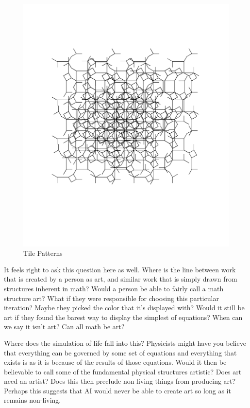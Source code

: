 \documentclass[12pt,twoside]{reedthesis}
\begin{document}
	\begin{figure}[h]
	\centering
	\includegraphics[clip=true, viewport=0in 3in 10in 10in, scale=0.5]{Images/TheTimesWeLiveIn1}
	\caption[Tile Patterns]{Tile Patterns\footnotemark}
	\label{TilePatterns}
	\end{figure}

	It feels right to ask this question here as well. Where is the line between work that is created by a person as art, and similar work that is simply drawn from structures inherent in math? Would a person be able to fairly call a math structure art? What if they were responsible for choosing this particular iteration? Maybe they picked the color that it's displayed with? Would it still be art if they found the barest way to display the simplest of equations? When can we say it isn't art? Can all math be art?
	
	Where does the simulation of life fall into this? Physicists might have you believe that everything can be governed by some set of equations and everything that exists is as it is because of the results of those equations. Would it then be believable to call some of the fundamental physical structures artistic? Does art need an artist? Does this then preclude non-living things from producing art? Perhaps this suggests that AI would never be able to create art so long as it remains non-living.
	
\end{document}
